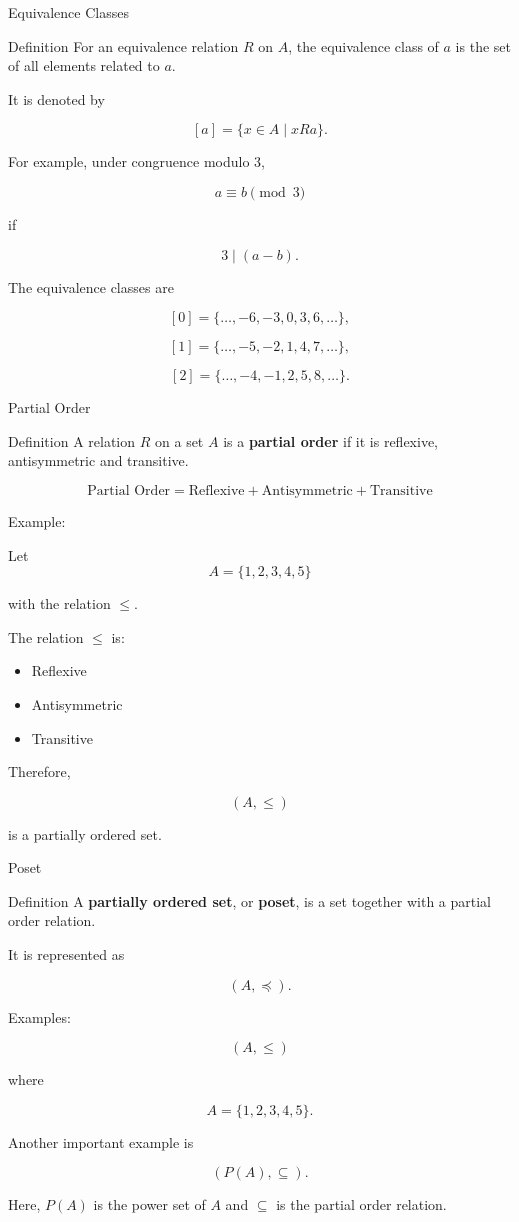 \documentclass[aspectratio=169]{beamer}
\begin{document}
\begin{frame}{Equivalence Classes}
\begin{block}{Definition}
For an equivalence relation $R$ on $A$, the equivalence class of $a$ is the set of all elements related to $a$.
\end{block}

It is denoted by

\[
[a]=\{x\in A\mid xRa\}.
\]

For example, under congruence modulo $3$,

\[
a\equiv b\pmod 3
\]

if

\[
3\mid(a-b).
\]

The equivalence classes are

\[
[0]=\{\ldots,-6,-3,0,3,6,\ldots\},
\]

\[
[1]=\{\ldots,-5,-2,1,4,7,\ldots\},
\]

\[
[2]=\{\ldots,-4,-1,2,5,8,\ldots\}.
\]
\end{frame}

\begin{frame}{Partial Order}
\begin{block}{Definition}
A relation $R$ on a set $A$ is a \textbf{partial order} if it is reflexive, antisymmetric and transitive.
\end{block}

\[
\boxed{
\text{Partial Order}
=
\text{Reflexive}+\text{Antisymmetric}+\text{Transitive}
}
\]

Example:

Let
\[
A=\{1,2,3,4,5\}
\]

with the relation $\leq$.

The relation $\leq$ is:

\begin{itemize}
\item Reflexive
\item Antisymmetric
\item Transitive
\end{itemize}

Therefore,

\[
(A,\leq)
\]

is a partially ordered set.
\end{frame}

\begin{frame}{Poset}
\begin{block}{Definition}
A \textbf{partially ordered set}, or \textbf{poset}, is a set together with a partial order relation.
\end{block}

It is represented as

\[
(A,\preceq).
\]

Examples:

\[
(A,\leq)
\]

where

\[
A=\{1,2,3,4,5\}.
\]

Another important example is

\[
(P(A),\subseteq).
\]

Here, $P(A)$ is the power set of $A$ and $\subseteq$ is the partial order relation.
\end{frame}
\end{document}
